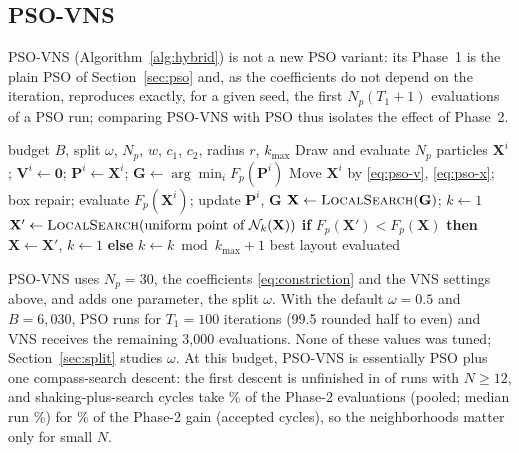 \subsection{PSO-VNS}
PSO-VNS (Algorithm~\ref{alg:hybrid}) is not a new PSO variant: its Phase~1 is the plain PSO of Section~\ref{sec:pso} and, as the coefficients do not depend on the iteration, reproduces exactly, for a given seed, the first $N_p(T_1+1)$ evaluations of a PSO run; comparing PSO-VNS with PSO thus isolates the effect of Phase~2.

\begin{algorithm}[!t]
\caption{PSO-VNS for a prescribed turbine count $N$}
\label{alg:hybrid}
\begin{algorithmic}[1]
\Require budget $B$, split $\omega$, $N_p$, $w$, $c_1$, $c_2$, radius $r$, $k_{\max}$
\State Draw and evaluate $N_p$ particles $\mathbf X^i$; $\mathbf V^i\gets\mathbf 0$; $\mathbf P^i\gets\mathbf X^i$; $\mathbf G\gets\arg\min_i F_p(\mathbf P^i)$ 
    \State Move $\mathbf X^i$ by \eqref{eq:pso-v}, \eqref{eq:pso-x}; box repair; evaluate $F_p(\mathbf X^i)$; update $\mathbf P^i$, $\mathbf G$
\EndFor
\State $\mathbf X\gets\textsc{LocalSearch}(\mathbf G)$; $k\gets1$ 
    \State $\mathbf X'\gets\textsc{LocalSearch}(\text{uniform point of }\mathcal N_k(\mathbf X))$
    \State \textbf{if} $F_p(\mathbf X')<F_p(\mathbf X)$ \textbf{then} $\mathbf X\gets \mathbf X'$, $k\gets1$ \textbf{else} $k\gets k\bmod k_{\max}+1$
\EndWhile
\State \Return best layout evaluated
\end{algorithmic}
\end{algorithm}


PSO-VNS uses $N_p=30$, the coefficients \eqref{eq:constriction} and the VNS settings above, and adds one parameter, the split $\omega$. With the default $\omega=0.5$ and $B=6{,}030$, PSO runs for $T_1=100$ iterations (99.5 rounded half to even) and VNS receives the remaining 3,000 evaluations. None of these values was tuned; Section~\ref{sec:split} studies $\omega$. At this budget, PSO-VNS is essentially PSO plus one compass-search descent: the first descent is unfinished in \NDDescentUnfinishedLargePSOVNS{} of \NDRunsLargePSOVNS{} runs with $N\ge12$, and shaking-plus-search cycles take \NDCycleEvalsPctPSOVNS\% of the Phase-2 evaluations (pooled; median run \NDCycleEvalsPctMedianPSOVNS\%) for \NDCycleSharePSOVNS\% of the Phase-2 gain (accepted cycles), so the neighborhoods matter only for small $N$.

